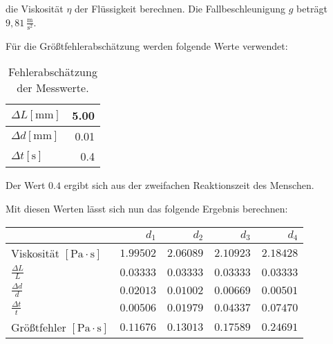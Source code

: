             die Viskosität $\eta$ der Flüssigkeit berechnen. Die Fallbeschleunigung $g$ beträgt $9,81\ \mathrm{\frac{m}{s^{2}}}$.

            Für die Größtfehlerabschätzung werden folgende Werte verwendet:

            \begin{table}[H]
                \centering
                \begin{tabular}{|l||r|}
                    \hline
                    $\Delta L [\mathrm{mm}]$ & 5.00\\
                    \hline
                    $\Delta d [\mathrm{mm}]$ & 0.01\\
                    \hline
                    $\Delta t [\mathrm{s}]$ & 0.4\\
                    \hline
                \end{tabular}
                \caption{Fehlerabschätzung der Messwerte.}
                \label{tab:Fehlerabschaetzung}
            \end{table}

            Der Wert $0.4$ ergibt sich aus der zweifachen Reaktionszeit des Menschen.

            Mit diesen Werten lässt sich nun das folgende Ergebnis berechnen:

            \begin{table}[H]
                \centering
                \begin{tabular}{|l||r|r|r|r|}
                    \hline
                    & $d_{1}$ & $d_{2}$ & $d_{3}$ & $d_{4}$\\
                    \hline \hline
                    Viskosität $[\mathrm{Pa \cdot s}]$ & $1.99502$ & $2.06089$ & $2.10923$ & $2.18428$\\
                    \hline
                    $\frac{\Delta L}{L}$ & $0.03333$ & $0.03333$ & $0.03333$ & $0.03333$\\
                    $\frac{\Delta d}{d}$ & $0.02013$ & $0.01002$ & $0.00669$ & $0.00501$\\
                    $\frac{\Delta t}{t}$ & $0.00506$ & $0.01979$ & $0.04337$ & $0.07470$\\
                    \hline
                    Größtfehler $[\mathrm{Pa \cdot s}]$ & $0.11676$ & $0.13013$ & $0.17589$ & $0.24691$\\
                    \hline
                \end{tabular}
            \end{table}


